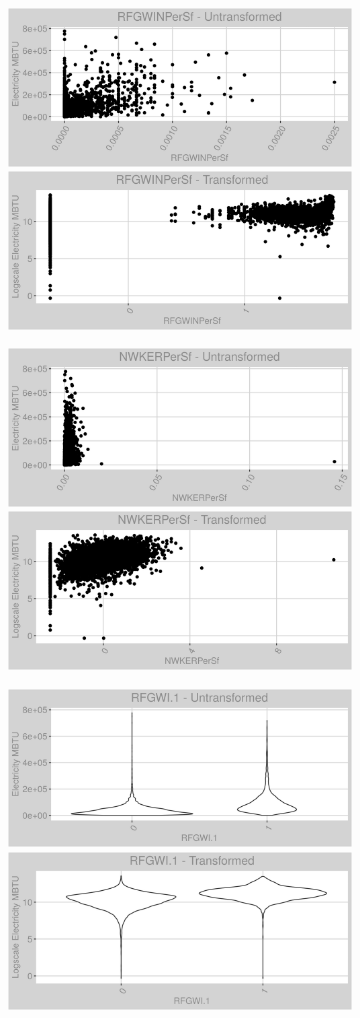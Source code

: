 \begin{figure}
\centering
\begin{subfigure}{1\textwidth}
\centering
\includegraphics[width=.49\textwidth, height=0.3\textheight]{Images/electricity_psf_var_original_0.png}
\includegraphics[width=.49\textwidth, height=0.3\textheight]{Images/electricity_psf_var_transformed_0.png}
\centering
\end{subfigure}
\begin{subfigure}{1\textwidth}
\centering
\includegraphics[width=.49\textwidth, height=0.3\textheight]{Images/electricity_psf_var_original_1.png}
\includegraphics[width=.49\textwidth, height=0.3\textheight]{Images/electricity_psf_var_transformed_1.png}
\end{subfigure}
\begin{subfigure}{1\textwidth}
\centering
\includegraphics[width=.49\textwidth, height=0.3\textheight]{Images/electricity_psf_var_original_2.png}
\includegraphics[width=.49\textwidth, height=0.3\textheight]{Images/electricity_psf_var_transformed_2.png}
\end{subfigure}
\end{figure}
